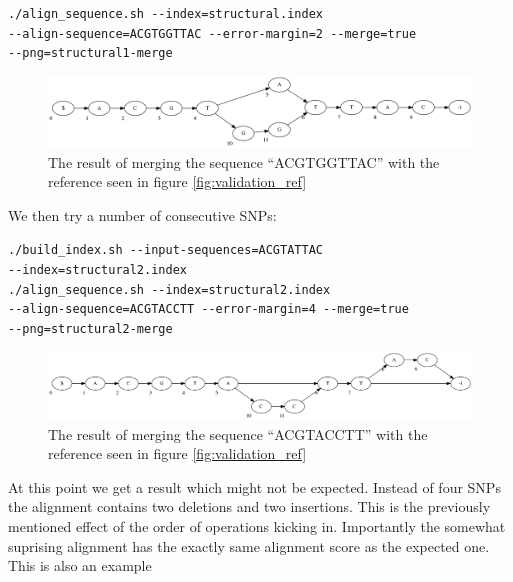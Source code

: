 \documentclass[thesis.tex]{subfiles}
\begin{document}
\texttt{./align\_sequence.sh -{}-index=structural.index \\
-{}-align-sequence=ACGTGGTTAC -{}-error-margin=2 -{}-merge=true \\
-{}-png=structural1-merge}\\
\begin{figure}[!h]
  \begin{mdframed}
  \includegraphics[width=\textwidth]{output/structural1-merge.png}
  \caption{The result of merging the sequence ``ACGTGGTTAC'' with the reference seen in figure \ref{fig:validation_ref}}
  \end{mdframed}
\end{figure}
We then try a number of consecutive SNPs:\\
\par\noindent
\texttt{./build\_index.sh -{}-input-sequences=ACGTATTAC \\
-{}-index=structural2.index}\\
\texttt{./align\_sequence.sh -{}-index=structural2.index \\
-{}-align-sequence=ACGTACCTT -{}-error-margin=4 -{}-merge=true \\
-{}-png=structural2-merge}\\
\begin{figure}[!h]
  \includegraphics[width=\textwidth]{output/structural2-merge.png}
  \caption{The result of merging the sequence ``ACGTACCTT'' with the reference seen in figure \ref{fig:validation_ref}}
\end{figure}
At this point we get a result which might not be expected. Instead of four SNPs the alignment contains two deletions and two insertions. This is the previously mentioned effect of the order of operations kicking in. Importantly the somewhat suprising alignment has the exactly same alignment score as the expected one. This is also an example 
\end{document}
